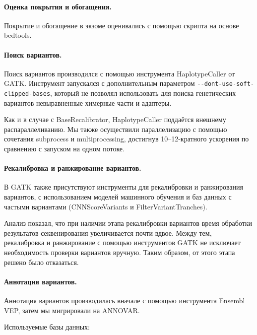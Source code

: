 \documentclass[a4paper,12pt]{article}
\begin{document}
\paragraph{Оценка покрытия и обогащения.}
Покрытие и обогащение в экзоме оценивались с помощью скрипта на основе bedtools\cite{bedtools}.

\paragraph{Поиск вариантов.}
Поиск вариантов производился с помощью инструмента HaplotypeCaller от GATK.
Инструмент запускался с дополнительным параметром \verb|--dont-use-soft-clipped-bases|, который не позволял использовать для поиска генетических вариантов невыравненные химерные части и адаптеры.

Как и в случае с BaseRecalibrator, HaplotypeCaller поддаётся внешнему распараллеливанию\cite{heldenbrand}.
Мы также осуществили параллелизацию с помощью сочетания subprocess и multiprocessing, достигнув 10--12-кратного ускорения по сравнению с запуском на одном потоке.

\paragraph{Рекалибровка и ранжирование вариантов.}
В GATK также присутствуют инструменты для рекалибровки и ранжирования вариантов, с использованием моделей машинного обучения и баз данных с частыми вариантами (CNNScoreVariants и FilterVariantTranches).

Анализ показал, что при наличии этапа рекалибровки вариантов время обработки результатов секвенирования увеличивается почти вдвое.
Между тем, рекалибровка и ранжирование с помощью инструментов GATK не исключает необходимость проверки вариантов вручную.
Таким образом, от этого этапа решено было отказаться.

\paragraph{Аннотация вариантов.}
Аннотация вариантов производилась вначале с помощью инструмента Ensembl VEP\cite{vep}, затем мы мигрировали на ANNOVAR\cite{annovar}.

Используемые базы данных:
\end{document}
